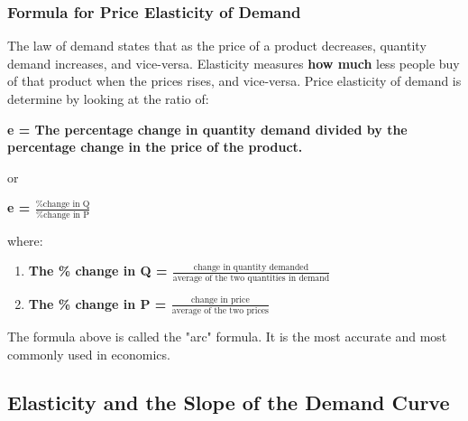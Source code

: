 \documentclass[a4paper, 12pt] {article}
\begin{document}
\subsubsection{Formula for Price Elasticity of Demand}
The law of demand states that as the price of a product decreases, quantity
demand increases, and vice-versa. Elasticity measures \textbf{how much} less
people buy of that product when the prices rises, and vice-versa. Price 
elasticity of demand is determine by looking at the ratio of:
\begin{description}
    \item \textbf{e = The percentage change in quantity demand divided by the
        percentage change in the price of the product.}
    \item or
    \item \textbf{e = $\frac{\text{\% change in Q}}{\text{\% change in P}}$ }
        
        \item where:

        \begin{enumerate}
            \item \textbf{The \% change in Q = $\frac{\text{change in quantity
                demanded}}{\text{average of the two quantities in demand}}$}
            \item \textbf{The \% change in P = $\frac{\text{change in price}}
            {\text{average of the two prices}}$}
        \end{enumerate}

    \item The formula above is called the "arc" formula. It is the most accurate
        and most commonly used in economics.
\end{description}

\subsection{Elasticity and the Slope of the Demand Curve}
\end{document}
